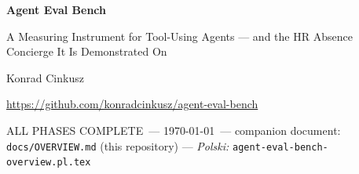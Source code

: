 \documentclass[11pt,a4paper]{article}
\newcommand{\paperstatus}{ALL PHASES COMPLETE}
\begin{document}
\thispagestyle{plain}
\begin{center}
    {\LARGE\bfseries\sffamily\color{darkblue} Agent Eval Bench}

    \vspace{0.3cm}

    {\Large\sffamily\color{darkgray} A Measuring Instrument for Tool-Using
    Agents --- and the HR Absence Concierge It Is Demonstrated On}

    \vspace{0.6cm}

    {\large Konrad Cinkusz}

    \vspace{0.2cm}

    {\normalsize\color{darkgray} \url{https://github.com/konradcinkusz/agent-eval-bench}}

    \vspace{0.2cm}

    {\normalsize\color{accentred}\sffamily \paperstatus\ --- \today\ ---
     companion document: \texttt{docs/OVERVIEW.md} (this repository) ---
     \textit{Polski: } \texttt{agent-eval-bench-overview.pl.tex}}
\end{center}

\vspace{0.4cm}
\end{document}
